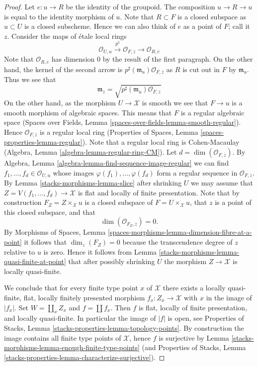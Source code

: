 \begin{proof}
\medskip\noindent
Let $e : u \to R$ be the identity of the groupoid. The composition
$u \to R \to u$ is equal to the identity morphism of $u$.
Note that $R \subset F$ is a closed
subspace as $u \subset U$ is a closed subscheme. Hence we can also think
of $e$ as a point of $F$; call it $z$.
Consider the maps of \'etale local rings
$$
\mathcal{O}_{U, u}
\xrightarrow{p^\sharp}
\mathcal{O}_{F, \overline{z}}
\longrightarrow
\mathcal{O}_{R, \overline{e}}
$$
Note that $\mathcal{O}_{R, \overline{e}}$ has dimension $0$ by the result
of the first paragraph. On the other hand, the kernel of the second arrow is
$p^\sharp(\mathfrak m_u)\mathcal{O}_{F, \overline{z}}$ as
$R$ is cut out in $F$ by $\mathfrak m_u$. Thus we see that
$$
\mathfrak m_{\overline{z}} =
\sqrt{p^\sharp(\mathfrak m_u)\mathcal{O}_{F, \overline{z}}}
$$
On the other hand, as the morphism $U \to \mathcal{X}$ is smooth
we see that $F \to u$ is a smooth morphism of algebraic spaces.
This means that $F$ is a regular algebraic space
(Spaces over Fields, Lemma \ref{spaces-over-fields-lemma-smooth-regular}).
Hence $\mathcal{O}_{F, \overline{z}}$ is a regular local ring
(Properties of Spaces, Lemma \ref{spaces-properties-lemma-regular}).
Note that a regular local ring is Cohen-Macaulay
(Algebra, Lemma \ref{algebra-lemma-regular-ring-CM}).
Let $d = \dim(\mathcal{O}_{F, \overline{z}})$. By
Algebra, Lemma \ref{algebra-lemma-find-sequence-image-regular}
we can find $f_1, \ldots, f_d \in \mathcal{O}_{U, u}$ whose images
$\varphi(f_1), \ldots, \varphi(f_d)$ form a regular sequence
in $\mathcal{O}_{F, \overline{z}}$. By
Lemma \ref{stacks-morphisms-lemma-slice}
after shrinking $U$ we may assume that
$Z = V(f_1, \ldots, f_d) \to \mathcal{X}$ is flat and
locally of finite presentation. Note that by construction
$F_Z = Z \times_\mathcal{X} u$ is a closed subspace of
$F = U \times_\mathcal{X} u$, that $z$ is a point of this closed subspace,
and that
$$
\dim(\mathcal{O}_{F_Z, \overline{z}}) = 0.
$$
By
Morphisms of Spaces,
Lemma \ref{spaces-morphisms-lemma-dimension-fibre-at-a-point}
it follows that $\dim_z(F_Z) = 0$ because the transcendence degree
of $z$ relative to $u$ is zero. Hence it follows from
Lemma \ref{stacks-morphisms-lemma-quasi-finite-at-point}
that after possibly shrinking $U$ the morphism $Z \to \mathcal{X}$
is locally quasi-finite.

\medskip\noindent
We conclude that for every finite type point $x$ of $\mathcal{X}$ there
exists a locally quasi-finite, flat, locally finitely presented
morphism $f_x : Z_x \to \mathcal{X}$ with $x$ in the image of $|f_x|$.
Set $W = \coprod_x Z_x$ and $f = \coprod f_x$. Then $f$ is flat, locally
of finite presentation, and locally quasi-finite. In particular the
image of $|f|$ is open, see
Properties of Stacks, Lemma \ref{stacks-properties-lemma-topology-points}.
By construction the image contains all finite type points of $\mathcal{X}$,
hence $f$ is surjective by
Lemma \ref{stacks-morphisms-lemma-enough-finite-type-points} (and
Properties of Stacks, Lemma
\ref{stacks-properties-lemma-characterize-surjective}).
\end{proof}

